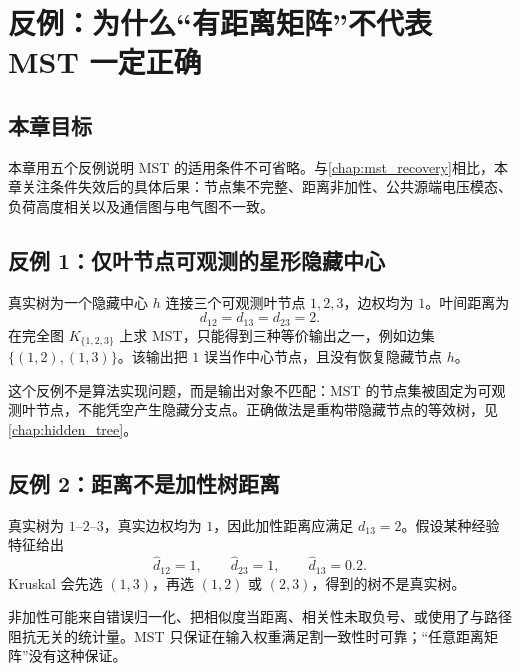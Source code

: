 \chapter{反例：为什么“有距离矩阵”不代表 MST 一定正确}
\label{chap:counterexamples}

\section*{本章目标}
本章用五个反例说明 MST 的适用条件不可省略。与\cref{chap:mst_recovery}相比，本章关注条件失效后的具体后果：节点集不完整、距离非加性、公共源端电压模态、负荷高度相关以及通信图与电气图不一致。

\section{反例 1：仅叶节点可观测的星形隐藏中心}

\begin{counterexample}[隐藏中心星形结构]
\label{cex:leaf_star}
真实树为一个隐藏中心 $h$ 连接三个可观测叶节点 $1,2,3$，边权均为 $1$。叶间距离为
\begin{equation}
  d_{12}=d_{13}=d_{23}=2.
\end{equation}
在完全图 $K_{\{1,2,3\}}$ 上求 MST，只能得到三种等价输出之一，例如边集 $\{(1,2),(1,3)\}$。该输出把 $1$ 误当作中心节点，且没有恢复隐藏节点 $h$。
\end{counterexample}

这个反例不是算法实现问题，而是输出对象不匹配：MST 的节点集被固定为可观测叶节点，不能凭空产生隐藏分支点。正确做法是重构带隐藏节点的等效树，见\cref{chap:hidden_tree}。

\section{反例 2：距离不是加性树距离}

\begin{counterexample}[非加性权重导致选错边]
\label{cex:nonadditive}
真实树为 $1$--$2$--$3$，真实边权均为 $1$，因此加性距离应满足 $d_{13}=2$。假设某种经验特征给出
\begin{equation}
  \widehat d_{12}=1,\qquad \widehat d_{23}=1,\qquad \widehat d_{13}=0.2.
\end{equation}
Kruskal 会先选 $(1,3)$，再选 $(1,2)$ 或 $(2,3)$，得到的树不是真实树。
\end{counterexample}

非加性可能来自错误归一化、把相似度当距离、相关性未取负号、或使用了与路径阻抗无关的统计量。MST 只保证在输入权重满足割一致性时可靠；“任意距离矩阵”没有这种保证。

